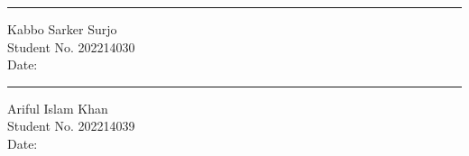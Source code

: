 \vspace{18mm}

\noindent
\begin{minipage}[t]{0.45\textwidth}
\hrule\medskip
Kabbo Sarker Surjo\\
Student No. 202214030\\
Date:
\end{minipage}
\hfill
\begin{minipage}[t]{0.45\textwidth}
\hrule\medskip
Ariful Islam Khan\\
Student No. 202214039\\
Date:
\end{minipage}
